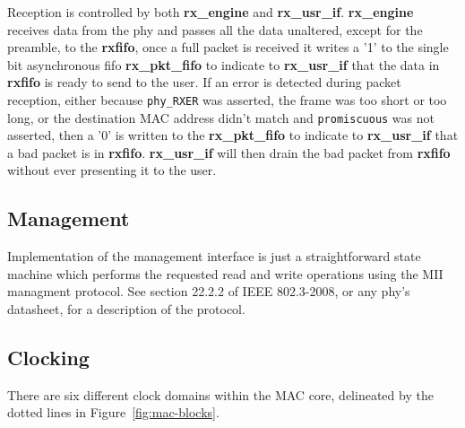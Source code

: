 \documentclass[11pt]{article}
\begin{document}
Reception is controlled by both \textbf{rx\_engine} and
\textbf{rx\_usr\_if}.  \textbf{rx\_engine} receives data from the phy
and passes all the data unaltered, except for the preamble, to the
\textbf{rxfifo}, once a full packet is received it writes a '1' to the
single bit asynchronous fifo \textbf{rx\_pkt\_fifo} to indicate to
\textbf{rx\_usr\_if} that the data in \textbf{rxfifo} is ready to send
to the user.  If an error is detected during packet reception, either
because \texttt{phy\_RXER} was asserted, the frame was too short or
too long, or the destination MAC address didn't match and
\texttt{promiscuous} was not asserted, then a '0' is written to the
\textbf{rx\_pkt\_fifo} to indicate to \textbf{rx\_usr\_if} that a bad
packet is in \textbf{rxfifo}.  \textbf{rx\_usr\_if} will then drain
the bad packet from \textbf{rxfifo} without ever presenting it to the
user.

\subsection{Management}

Implementation of the management interface is just a straightforward
state machine which performs the requested read and write operations
using the MII managment protocol.  See section 22.2.2 of IEEE
802.3-2008, or any phy's datasheet, for a description of the protocol.

\subsection{Clocking}

There are six different clock domains within the MAC core, delineated
by the dotted lines in Figure~\ref{fig:mac-blocks}. 
\end{document}
